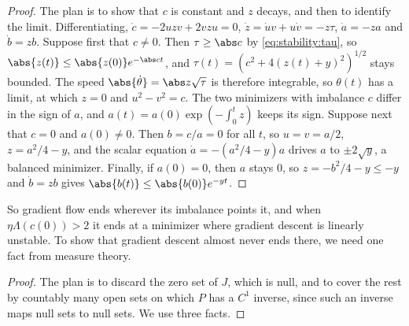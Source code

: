 \begin{refsection}

\begin{proof}
The plan is to show that $c$ is constant and $z$ decays, and then to identify the limit. Differentiating, $\dot c=-2uzv+2vzu=0$, $\dot z=\dot uv+u\dot v=-z\tau$, $\dot a=-za$ and $\dot b=zb$. Suppose first that $c\ne0$. Then $\tau\ge\abs c$ by \eqref{eq:stability:tau}, so $\abs{z(t)}\le\abs{z(0)}e^{-\abs ct}$, and $\tau(t)=(c^2+4(z(t)+y)^2)^{1/2}$ stays bounded. The speed $\abs{\dot\theta}=\abs z\sqrt\tau$ is therefore integrable, so $\theta(t)$ has a limit, at which $z=0$ and $u^2-v^2=c$. The two minimizers with imbalance $c$ differ in the sign of $a$, and $a(t)=a(0)\exp(-\int_0^tz)$ keeps its sign. Suppose next that $c=0$ and $a(0)\ne0$. Then $b=c/a=0$ for all $t$, so $u=v=a/2$, $z=a^2/4-y$, and the scalar equation $\dot a=-(a^2/4-y)a$ drives $a$ to $\pm2\sqrt y$, a balanced minimizer. Finally, if $a(0)=0$, then $a$ stays $0$, so $z=-b^2/4-y\le-y$ and $\dot b=zb$ gives $\abs{b(t)}\le\abs{b(0)}e^{-yt}$.
\end{proof}

So gradient flow ends wherever its imbalance points it, and when $\eta\Lambda(c(0))>2$ it ends at a minimizer where gradient descent is linearly unstable. To show that gradient descent almost never ends there, we need one fact from measure theory.


\begin{proof}
The plan is to discard the zero set of $J$, which is null, and to cover the rest by countably many open sets on which $P$ has a $C^1$ inverse, since such an inverse maps null sets to null sets. We use three facts.


\end{proof}
\end{refsection}
